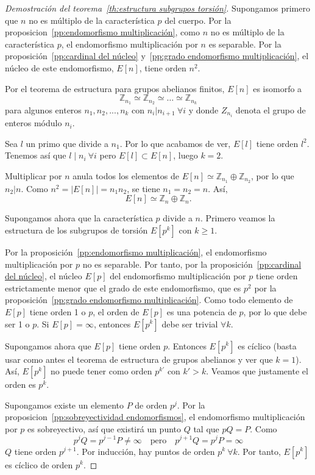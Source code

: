 \begin{proof}[Demostración del teorema~\ref{th:estructura subgrupos torsión}]
Supongamos primero que $n$ no es múltiplo de la característica $p$ del cuerpo. Por la proposicion~\ref{pp:endomorfismo multiplicación}, como $n$ no es múltiplo de la característica $p$, el endomorfismo multiplicación por $n$ es separable. Por la proposición~\ref{pp:cardinal del núcleo} y~\ref{pp:grado endomorfismo multiplicación}, el núcleo de este endomorfismo, $E[n]$, tiene orden $n^2$.

Por el teorema de estructura para grupos abelianos finitos, $E[n]$ es isomorfo a
$$
	\mathbb{Z}_{n_1} \simeq \mathbb{Z}_{n_2} \simeq \ldots \simeq \mathbb{Z}_{n_k}
$$
para algunos enteros $n_1, n_2, ..., n_k$ con $n_i | n_{i+1} \ \forall i$ y donde $Z_{n_i}$ denota el grupo de enteros módulo $n_i$.

Sea $l$ un primo que divide a $n_1$. Por lo que acabamos de ver, $E[l]$ tiene orden $l^2$. Tenemos así que $l \mid n_i \ \forall i$ pero $E[l] \subset E[n]$, luego $k = 2$.

Multiplicar por $n$ anula todos los elementos de $E[n] \simeq \mathbb{Z}_{n_1} \oplus \mathbb{Z}_{n_2}$, por lo que $n_2 | n$. Como $n^2 = \left\vert{E[n] }\right\vert = n_1 n_2$, se tiene $n_1 = n_2 = n$. Así,
$$
	E[n] \simeq \mathbb{Z}_n \oplus \mathbb{Z}_n.
$$

Supongamos ahora que la característica $p$ divide a $n$. Primero veamos la estructura de los subgrupos de torsión $E[p^k]$ con $k \ge 1$.

Por la proposición~\ref{pp:endomorfismo multiplicación}, el endomorfismo multiplicación por $p$ no es separable. Por tanto, por la proposición~\ref{pp:cardinal del núcleo}, el núcleo $E[p]$ del endomorfismo multiplicación por $p$ tiene orden estrictamente menor que el grado de este endomorfismo, que es $p^2$ por la proposición~\ref{pp:grado endomorfismo multiplicación}. Como todo elemento de $E[p]$ tiene orden 1 o $p$, el orden de $E[p]$ es una potencia de $p$, por lo que debe ser 1 o $p$. Si $E[p] = {\infty}$, entonces $E[p^k]$ debe ser trivial $\forall k$.

Supongamos ahora que $E[p]$ tiene orden $p$. Entonces $E[p^k]$ es cíclico (basta usar como antes el teorema de estructura de grupos abelianos y ver que $k = 1$). Así, $E[p^k]$ no puede tener como orden $p^{k'}$ con $k' > k$. Veamos que justamente el orden es $p^k$.

Supongamos existe un elemento $P$ de orden $p^j$. Por la proposicion~\ref{pp:sobreyectividad endomorfismos}, el endomorfismo multiplicación por $p$ es sobreyectivo, así que existirá un punto $Q$ tal que $p Q = P$. Como
$$
	p^j Q = p^{j-1} P \neq \infty \quad \textrm{pero} \quad p^{j+1} Q = p^j P = \infty
$$
$Q$ tiene orden $p^{j+1}$. Por inducción, hay puntos de orden $p^k \ \forall k$. Por tanto, $E[p^k]$ es cíclico de orden $p^k$.


\end{proof}
